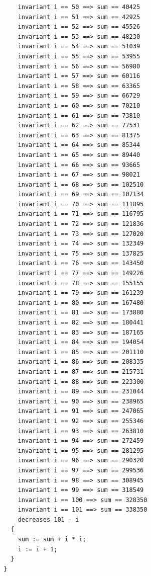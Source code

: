 \documentclass{article}
\begin{document}
\begin{lstlisting}
    invariant i == 50 ==> sum == 40425
    invariant i == 51 ==> sum == 42925
    invariant i == 52 ==> sum == 45526
    invariant i == 53 ==> sum == 48230
    invariant i == 54 ==> sum == 51039
    invariant i == 55 ==> sum == 53955
    invariant i == 56 ==> sum == 56980
    invariant i == 57 ==> sum == 60116
    invariant i == 58 ==> sum == 63365
    invariant i == 59 ==> sum == 66729
    invariant i == 60 ==> sum == 70210
    invariant i == 61 ==> sum == 73810
    invariant i == 62 ==> sum == 77531
    invariant i == 63 ==> sum == 81375
    invariant i == 64 ==> sum == 85344
    invariant i == 65 ==> sum == 89440
    invariant i == 66 ==> sum == 93665
    invariant i == 67 ==> sum == 98021
    invariant i == 68 ==> sum == 102510
    invariant i == 69 ==> sum == 107134
    invariant i == 70 ==> sum == 111895
    invariant i == 71 ==> sum == 116795
    invariant i == 72 ==> sum == 121836
    invariant i == 73 ==> sum == 127020
    invariant i == 74 ==> sum == 132349
    invariant i == 75 ==> sum == 137825
    invariant i == 76 ==> sum == 143450
    invariant i == 77 ==> sum == 149226
    invariant i == 78 ==> sum == 155155
    invariant i == 79 ==> sum == 161239
    invariant i == 80 ==> sum == 167480
    invariant i == 81 ==> sum == 173880
    invariant i == 82 ==> sum == 180441
    invariant i == 83 ==> sum == 187165
    invariant i == 84 ==> sum == 194054
    invariant i == 85 ==> sum == 201110
    invariant i == 86 ==> sum == 208335
    invariant i == 87 ==> sum == 215731
    invariant i == 88 ==> sum == 223300
    invariant i == 89 ==> sum == 231044
    invariant i == 90 ==> sum == 238965
    invariant i == 91 ==> sum == 247065
    invariant i == 92 ==> sum == 255346
    invariant i == 93 ==> sum == 263810
    invariant i == 94 ==> sum == 272459
    invariant i == 95 ==> sum == 281295
    invariant i == 96 ==> sum == 290320
    invariant i == 97 ==> sum == 299536
    invariant i == 98 ==> sum == 308945
    invariant i == 99 ==> sum == 318549
    invariant i == 100 ==> sum == 328350
    invariant i == 101 ==> sum == 338350
    decreases 101 - i
  {
    sum := sum + i * i;
    i := i + 1;
  }
}
\end{lstlisting}
\end{document}
